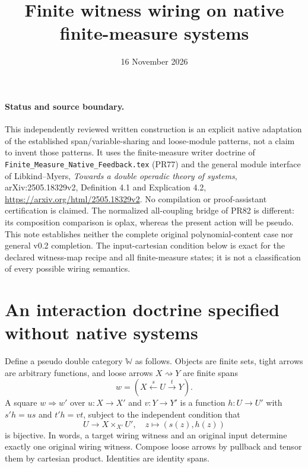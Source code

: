 \documentclass{article}
\title{Finite witness wiring on native finite-measure systems}
\date{16 November 2026}
\begin{document}
\maketitle
\paragraph{Status and source boundary.}
This independently reviewed written construction is an explicit native adaptation of the established span/variable-sharing and loose-module patterns, not a claim to invent those patterns. It uses the finite-measure writer doctrine of \texttt{Finite\_Measure\_Native\_Feedback.tex} (PR77) and the general module interface of Libkind--Myers, \emph{Towards a double operadic theory of systems}, arXiv:2505.18329v2, Definition 4.1 and Explication 4.2, \url{https://arxiv.org/html/2505.18329v2}. No compilation or proof-assistant certification is claimed. The normalized all-coupling bridge of PR82 is different: its composition comparison is oplax, whereas the present action will be pseudo. This note establishes neither the complete original polynomial-content case nor general v0.2 completion. The input-cartesian condition below is exact for the declared witness-map recipe and all finite-measure states; it is not a classification of every possible wiring semantics.

\section{An interaction doctrine specified without native systems}
Define a pseudo double category $\mathbb W$ as follows. Objects are finite sets, tight arrows are arbitrary functions, and loose arrows $X\rightsquigarrow Y$ are finite spans
\[w=(X\xleftarrow{s}U\xrightarrow{t}Y).\]
A square $w\Rightarrow w'$ over $u:X\to X'$ and $v:Y\to Y'$ is a function $h:U\to U'$ with $s'h=us$ and $t'h=vt$, subject to the independent condition that
\[U\longrightarrow X\times_{X'}U',\quad z\longmapsto(s(z),h(z))\tag{PB}\]
is bijective. In words, a target wiring witness and an original input determine exactly one original wiring witness. Compose loose arrows by pullback and tensor them by cartesian product. Identities are identity spans.
\end{document}
